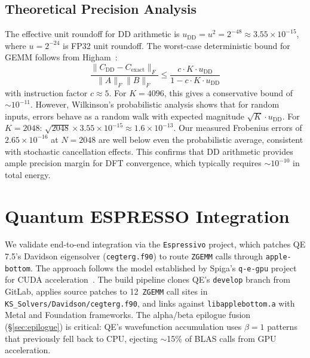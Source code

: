 \documentclass[conference]{IEEEtran}
\newcommand{\ZGEMM}{\texttt{ZGEMM}}
\newcommand{\dd}{\mathrm{DD}}
\newcommand{\AB}{\texttt{apple-bottom}}
\begin{document}
\subsection{Theoretical Precision Analysis}
The effective unit roundoff for DD arithmetic is $u_\dd = u^2 = 2^{-48} \approx 3.55 \times 10^{-15}$, where $u = 2^{-24}$ is FP32 unit roundoff. The worst-case deterministic bound for GEMM follows from Higham~\cite{Higham2002}:
\begin{equation}
\frac{\|C_\dd - C_{\text{exact}}\|_F}{\|A\|_F \|B\|_F} \leq \frac{c \cdot K \cdot u_\dd}{1 - c \cdot K \cdot u_\dd}
\label{eq:higham}
\end{equation}
with instruction factor $c \approx 5$. For $K{=}4096$, this gives a conservative bound of ${\sim}10^{-11}$.
However, Wilkinson's probabilistic analysis shows that for random inputs, errors behave as a random walk with expected magnitude $\sqrt{K} \cdot u_\dd$. For $K{=}2048$: $\sqrt{2048} \times 3.55 \times 10^{-15} \approx 1.6 \times 10^{-13}$. Our measured Frobenius errors of $2.65 \times 10^{-16}$ at $N{=}2048$ are well below even the probabilistic average, consistent with stochastic cancellation effects. This confirms that DD arithmetic provides ample precision margin for DFT convergence, which typically requires ${\sim}10^{-10}$ in total energy.
\section{Quantum ESPRESSO Integration}
\label{sec:qe}
We validate end-to-end integration via the \texttt{Espressivo} project, which patches QE 7.5's Davidson eigensolver (\texttt{cegterg.f90}) to route \ZGEMM{} calls through \AB{}. The approach follows the model established by Spiga's \texttt{q-e-gpu} project for CUDA acceleration~\cite{QE-GPU}.
The build pipeline clones QE's \texttt{develop} branch from GitLab, applies source patches to 12~\ZGEMM{} call sites in \texttt{KS\_Solvers/Davidson/cegterg.f90}, and links against \texttt{libapplebottom.a} with Metal and Foundation frameworks. The alpha/beta epilogue fusion (\S\ref{sec:epilogue}) is critical: QE's wavefunction accumulation uses $\beta{=}1$ patterns that previously fell back to CPU, ejecting ${\sim}$15\% of BLAS calls from GPU acceleration.
\end{document}
